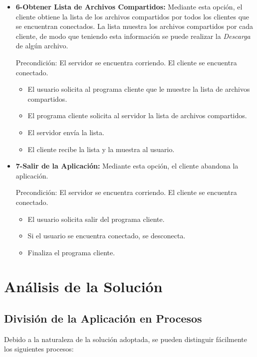 \documentclass[a4paper,10pt]{article}
\begin{document}
\begin{itemize}
                \item \textbf{6-Obtener Lista de Archivos Compartidos:} Mediante esta opci\'on, el cliente obtiene la lista de los archivos compartidos por 
				todos los clientes que se encuentran conectados. La lista muestra los archivos compartidos por cada cliente, de modo que teniendo esta 
				informaci\'on se puede realizar la \emph{Descarga} de alg\'un archivo.
                   
                Precondici\'on: El servidor se encuentra corriendo. El cliente se encuentra conectado.
				
                \begin{itemize}
                   \item El usuario solicita al programa cliente que le muestre la lista de archivos compartidos.
                   \item El programa cliente solicita al servidor la lista de archivos compartidos.
                   \item El servidor env\'ia la lista.
                   \item El cliente recibe la lista y la muestra al usuario.
                \end{itemize}
                
                \item \textbf{7-Salir de la Aplicaci\'on:} Mediante esta opci\'on, el cliente abandona la aplicaci\'on.

                Precondici\'on: El servidor se encuentra corriendo. El cliente se encuentra conectado.
                
                \begin{itemize}
                    \item El usuario solicita salir del programa cliente.
                    \item Si el usuario se encuentra conectado, se desconecta.
                    \item Finaliza el programa cliente.
                \end{itemize}
			\end{itemize}

	\section{An\'alisis de la Soluci\'on}
		\subsection{Divisi\'on de la Aplicaci\'on en Procesos}
			Debido a la naturaleza de la soluci\'on adoptada, se pueden distinguir f\'acilmente los siguientes procesos:
\end{document}
